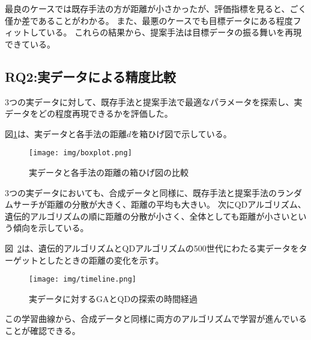 \documentclass[uplatex,11pt,openany]{ujreport}
\begin{document}
            最良のケースでは既存手法の方が距離が小さかったが、評価指標を見ると、ごく僅か差であることがわかる。
            また、最悪のケースでも目標データにある程度フィットしている。
            これらの結果から、提案手法は目標データの振る舞いを再現できている。


        \subsection{RQ2:実データによる精度比較}
            3つの実データに対して、既存手法と提案手法で最適なパラメータを探索し、実データをどの程度再現できるかを評価した。

            図\ref{fig:boxplot}は、実データと各手法の距離$d$を箱ひげ図で示している。
            \begin{figure}[H]
                \centering
                \texttt{[image: img/boxplot.png]}
                \caption{実データと各手法の距離の箱ひげ図の比較}
                \label{fig:boxplot}
            \end{figure}

            3つの実データにおいても、合成データと同様に、既存手法と提案手法のランダムサーチが距離の分散が大きく、距離の平均も大きい。
            次にQDアルゴリズム、遺伝的アルゴリズムの順に距離の分散が小さく、全体としても距離が小さいという傾向を示している。


            図~\ref{fig:timeline}は、遺伝的アルゴリズムとQDアルゴリズムの500世代にわたる実データをターゲットとしたときの距離の変化を示す。
            \begin{figure}[H]
                \centering
                \texttt{[image: img/timeline.png]}
                \caption{実データに対するGAとQDの探索の時間経過}
                \label{fig:timeline}
            \end{figure}
            この学習曲線から、合成データと同様に両方のアルゴリズムで学習が進んでいることが確認できる。
\end{document}
